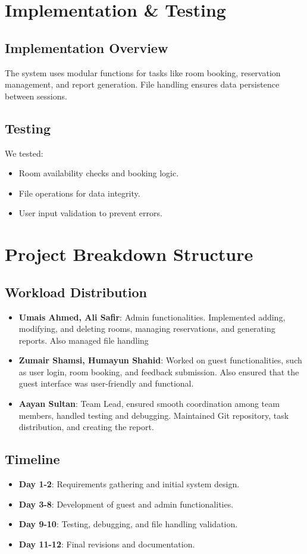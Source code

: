\documentclass[12pt,a4paper]{article}
\begin{document}
\section{Implementation \& Testing}
\subsection{Implementation Overview}
The system uses modular functions for tasks like room booking, reservation management, and report generation. File handling ensures data persistence between sessions.

\subsection{Testing}
We tested:
\begin{itemize}
    \item Room availability checks and booking logic.
    \item File operations for data integrity.
    \item User input validation to prevent errors.
\end{itemize}

\section{Project Breakdown Structure}
\subsection{Workload Distribution}
\begin{itemize}
    \item \textbf{Umais Ahmed, Ali Safir}: Admin functionalities. Implemented adding, modifying, and deleting rooms, managing reservations, and generating reports. Also managed file handling
      \item \textbf{Zumair Shamsi, Humayun Shahid}: Worked on guest functionalities, such as user login, room booking, and feedback submission. Also ensured that the guest interface was user-friendly and functional.
    \item \textbf{Aayan Sultan}: Team Lead, ensured smooth coordination among team members, handled testing and debugging. Maintained Git repository, task distribution, and creating the report.

\end{itemize}

\clearpage

\subsection{Timeline}
\begin{itemize}
    \item \textbf{Day 1-2}: Requirements gathering and initial system design.
    \item \textbf{Day 3-8}: Development of guest and admin functionalities.
    \item \textbf{Day 9-10}: Testing, debugging, and file handling validation.
    \item \textbf{Day 11-12}: Final revisions and documentation.
\end{itemize}
\end{document}
